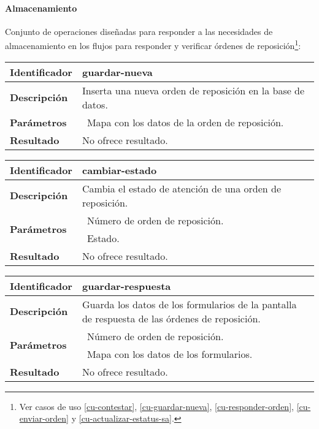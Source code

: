 \paragraph{Almacenamiento\\}
Conjunto de operaciones diseñadas para responder a las necesidades de almacenamiento en los flujos para responder y verificar órdenes de reposición\footnote{Ver casos de uso \ref{cu-contestar}, \ref{cu-guardar-nueva}, \ref{cu-responder-orden}, \ref{cu-enviar-orden} y \ref{cu-actualizar-estatus-sa}.}:

	\begin{longtable}{|p{}|p{}|}
		\hline
		\textbf{Identificador}	& \textbf{guardar-nueva} \\
		\hline
		\hline
		\textbf{Descripción}	& Inserta una nueva orden de reposición en la base de datos.\\
		\hline
		\textbf{Parámetros} 	& \textbullet\, Mapa con los datos de la orden de reposición.\\
		\hline
		\textbf{Resultado}		& No ofrece resultado.\\
		\hline
	\end{longtable}

	\begin{longtable}{|p{}|p{}|}
		\hline
		\textbf{Identificador}	& \textbf{cambiar-estado} \\
		\hline
		\hline
		\textbf{Descripción}	& Cambia el estado de atención de una orden de reposición. \\
		\hline
		\multirow{2}{*}{\textbf{Parámetros}}	& \textbullet\, Número de orden de reposición.\\
												& \textbullet\, Estado.\\
		\hline
		\textbf{Resultado}		& No ofrece resultado.\\
		\hline
	\end{longtable}

	\begin{longtable}{|p{}|p{}|}
		\hline
		\textbf{Identificador}	& \textbf{guardar-respuesta}\\
		\hline
		\hline
		\textbf{Descripción}	& Guarda los datos de los formularios de la pantalla de respuesta de las órdenes de reposición.\\
		\hline
		\multirow{2}{*}{\textbf{Parámetros}}	& \textbullet\, Número de orden de reposición.\\
												& \textbullet\, Mapa con los datos de los formularios.\\
		\hline
		\textbf{Resultado}		& No ofrece resultado.\\
		\hline
	\end{longtable}

